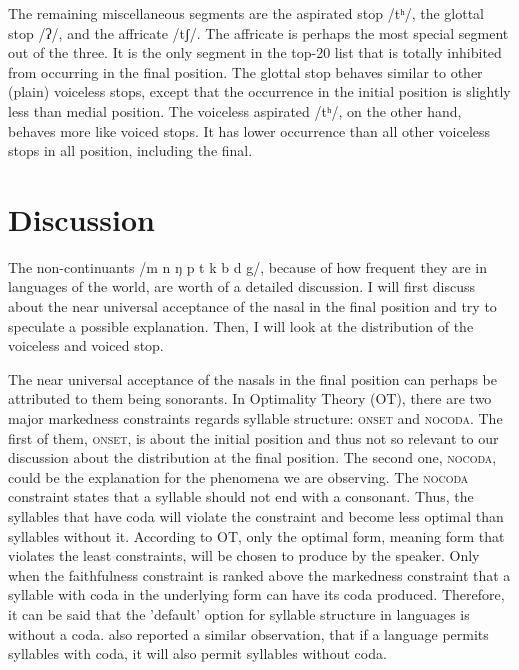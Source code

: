 \par
The remaining miscellaneous segments are the aspirated stop /tʰ/, the glottal stop /ʔ/, and the affricate /tʃ/. 
The affricate is perhaps the most special segment out of the three. 
It is the only segment in the top-20 list that is totally inhibited from occurring in the final position. 
The glottal stop behaves similar to other (plain) voiceless stops, except that the occurrence in the initial position is slightly less than medial position. 
The voiceless aspirated /tʰ/, on the other hand, behaves more like voiced stops.
It has lower occurrence than all other voiceless stops in all position, including the final.

\section{Discussion}

The non-continuants /m n ŋ p t k b d g/, because of how frequent they are in languages of the world, are worth of a detailed discussion.
I will first discuss about the near universal acceptance of the nasal in the final position and try to speculate a possible explanation.
Then, I will look at the distribution of the voiceless and voiced stop.

\par
The near universal acceptance of the nasals in the final position can perhaps be attributed to them being sonorants.
In Optimality Theory (OT), there are two major markedness constraints regards syllable structure: \textsc{onset} and \textsc{nocoda}.
The first of them, \textsc{onset}, is about the initial position and thus not so relevant to our discussion about the distribution at the final position.
The second one, \textsc{nocoda}, could be the explanation for the phenomena we are observing.
The \textsc{nocoda} constraint states that a syllable should not end with a consonant.
Thus, the syllables that have coda will violate the constraint and become less optimal than syllables without it.
According to OT, only the optimal form, meaning form that violates the least constraints, will be chosen to produce by the speaker.
Only when the faithfulness constraint is ranked above the markedness constraint that a syllable with coda in the underlying form can have its coda produced.
Therefore, it can be said that the 'default' option for syllable structure in languages is without a coda.
\citet{Gordon_2016} also reported a similar observation, that if a language permits syllables with coda, it will also permit syllables without coda.

